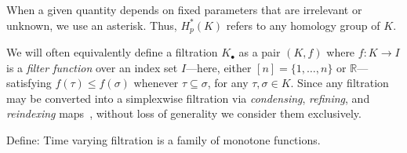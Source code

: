 When a given quantity depends on fixed parameters that are irrelevant or unknown, we use an asterisk. Thus, $H_p^\ast(K)$ refers to any homology group of $K$. 


	We will often equivalently define a filtration $K_\bullet$ as a pair $(K, f)$ where $f : K \to I$ is a \emph{filter function} over an index set $I$---here, either $[n] = \{ 1, \dots, n\}$ or $\mathbb{R}$---satisfying $f(\tau) \leq f(\sigma)$ whenever $\tau \subseteq \sigma$, for any $\tau,\sigma \in K$. 
Since any filtration may be converted into a simplexwise filtration via \emph{condensing}, \emph{refining}, and \emph{reindexing} maps~\cite{bauer2021ripser}, without loss of generality we consider them exclusively.

Define: Time varying filtration is a family of monotone functions. 

